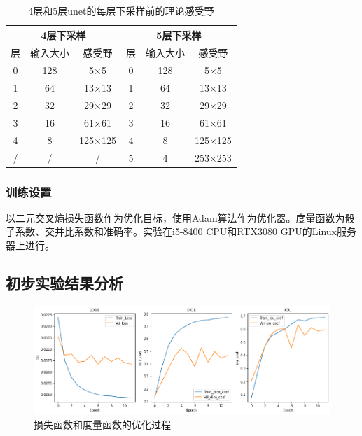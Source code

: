 \documentclass[letterpaper, 10pt, conference, twoside]{ieeeconf}
\begin{document}
\begin{table}[htbp]
  \centering
  \caption{4层和5层unet的每层下采样前的理论感受野}
  \label{tab:table5}
  \begin{tabular}{ccc||ccc}
    \toprule
    \multicolumn{3}{c}{\textbf{4层下采样}} & \multicolumn{3}{c}{\textbf{5层下采样}} \\
    \toprule
    层&输入大小&感受野&层&输入大小&感受野 \\
    \midrule
      0&128&5$\times$5&0&128&5$\times$5 \\
    \midrule
      1&64&13$\times$13&1&64&13$\times$13 \\
    \midrule
      2&32&29$\times$29&2&32&29$\times$29 \\
    \midrule
      3&16&61$\times$61&3&16&61$\times$61 \\
    \midrule
      4&8&125$\times$125&4&8&125$\times$125 \\
    \midrule
      /&/&/&5&4&253$\times$253 \\
    \bottomrule
   \end{tabular}
\end{table}



\subsubsection{训练设置}

以二元交叉熵损失函数作为优化目标，使用Adam算法作为优化器。度量函数为骰子系数、交并比系数和准确率。实验在i5-8400 CPU和RTX3080 GPU的Linux服务器上进行。

\subsection{初步实验结果分析}

\begin{figure}[htbp]
  \centering
  \includegraphics[width = 1\linewidth]{metric_result.png}
  \caption{损失函数和度量函数的优化过程}
  \label{fig:fig7}
\end{figure}
\end{document}
